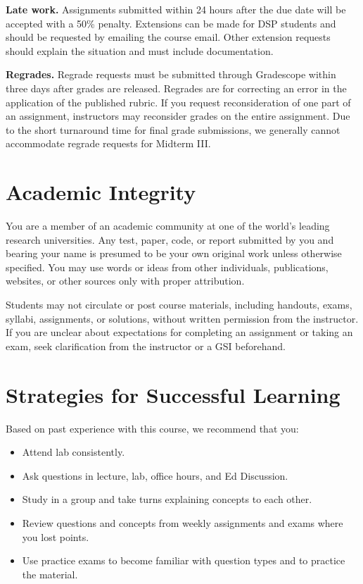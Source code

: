 \documentclass[11pt]{article}
\begin{document}
\textbf{Late work.} Assignments submitted within 24 hours after the due date 
will be accepted with a 50\% penalty. Extensions can be made for DSP students 
and should be requested by emailing the course email. Other extension requests 
should explain the situation and must include documentation.

\textbf{Regrades.} Regrade requests must be submitted through Gradescope within
three days after grades are released. Regrades are for correcting an error in
the application of the published rubric. If you request reconsideration of one
part of an assignment, instructors may reconsider grades on the entire
assignment. Due to the short turnaround time for final grade submissions, we
generally cannot accommodate regrade requests for Midterm III.

\section*{Academic Integrity}

You are a member of an academic community at one of the world's leading
research universities. Any test, paper, code, or report submitted by you and
bearing your name is presumed to be your own original work unless otherwise
specified. You may use words or ideas from other individuals, publications,
websites, or other sources only with proper attribution.

Students may not circulate or post course materials, including handouts, exams,
syllabi, assignments, or solutions, without written permission from the
instructor. If you are unclear about expectations for completing an assignment
or taking an exam, seek clarification from the instructor or a GSI beforehand.

\section*{Strategies for Successful Learning}

Based on past experience with this course, we recommend that you:
\begin{itemize}
  \item Attend lab consistently.
  \item Ask questions in lecture, lab, office hours, and Ed Discussion.
  \item Study in a group and take turns explaining concepts to each other.
  \item Review questions and concepts from weekly assignments and exams where you lost points.
  \item Use practice exams to become familiar with question types and to practice the material.
\end{itemize}
\end{document}
